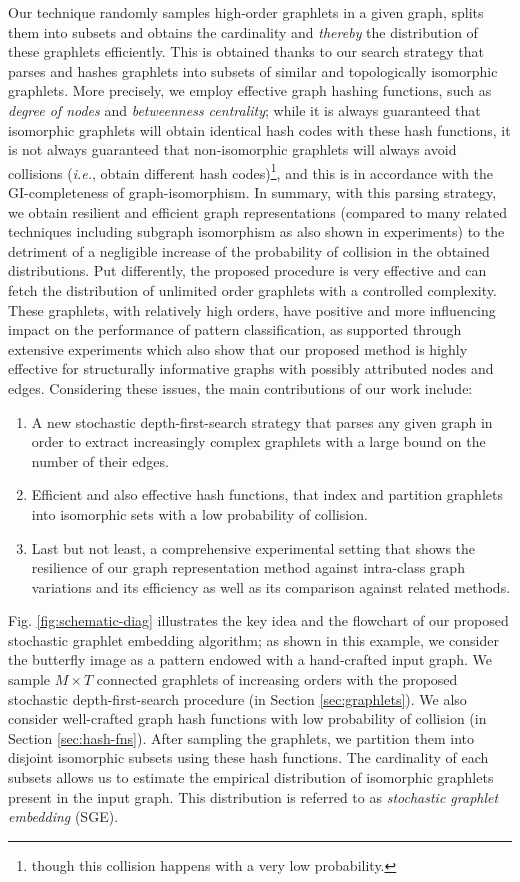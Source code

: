 \documentclass[journal]{IEEEtran}
\theoremstyle{definition}
\newcommand{\ie}{\textit{i.e.}}
\newcommand{\fig}[1]{Fig. \ref{#1}}
\newcommand{\sect}[1]{Section \ref{#1}}
\begin{document}
Our technique randomly samples high-order graphlets in a given graph, splits them into subsets and obtains the cardinality and {\it thereby} the distribution of these graphlets efficiently. This is obtained thanks to our search strategy that parses and hashes graphlets into subsets of similar and topologically isomorphic graphlets. More precisely, we employ effective graph hashing functions, such as \emph{degree of nodes} and \emph{betweenness centrality}; while it is always guaranteed that isomorphic graphlets will obtain identical hash codes with these hash functions, it is not always guaranteed that non-isomorphic graphlets will always avoid collisions (\ie, obtain different hash codes)\footnote{though this collision happens with a very low probability.}, and this is in accordance with the GI-completeness of graph-isomorphism. In summary, with this parsing strategy, we obtain resilient and efficient graph representations (compared to many related techniques including subgraph isomorphism as also shown in experiments) to the detriment of a negligible increase of the probability of collision in the obtained distributions. Put differently, the proposed procedure is very effective and can fetch the distribution of unlimited order graphlets with a controlled complexity. These graphlets, with relatively high orders, have positive and more influencing impact on the performance of pattern classification, as supported through extensive experiments which also show that our proposed method is highly effective for structurally informative graphs with possibly attributed nodes and edges. Considering these issues, the main contributions of our work include:
\begin{enumerate}
\item A new stochastic depth-first-search strategy that parses any given graph in order to extract increasingly complex graphlets with a large bound on the number of their edges. 
\item Efficient and also effective hash functions, that index and partition graphlets into isomorphic sets with a low probability of collision. 
\item Last but not least, a comprehensive experimental setting that shows the resilience of our graph representation method against intra-class graph variations and its efficiency as well as its comparison against related methods. 
\end{enumerate}

\fig{fig:schematic-diag} illustrates the key idea and the flowchart of our proposed stochastic graphlet embedding algorithm; as shown in this example, we consider the butterfly image as a pattern endowed with a hand-crafted input graph. We sample $M\times T$ connected graphlets of increasing orders with the proposed stochastic depth-first-search procedure (in \sect{sec:graphlets}). We also consider well-crafted graph hash functions with low probability of collision (in \sect{sec:hash-fns}). After sampling the graphlets, we partition them into disjoint isomorphic subsets using these hash functions. The cardinality of each subsets allows us to estimate the empirical distribution of isomorphic graphlets present in the input graph. This distribution is referred to as \emph{stochastic graphlet embedding} (SGE).
\end{document}
